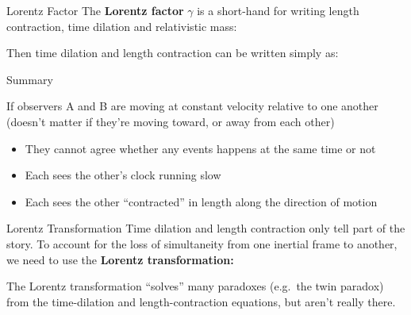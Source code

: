 \documentclass[12pt,compress,aspectratio=169]{beamer}
\newcommand{\bigsqrt}{\ensuremath\sqrt{1-\left(\frac{v}{c}\right)^2}}
\newcommand{\lorentz}{\ensuremath\frac{1}{\bigsqrt}}
\newcommand{\eq}[2]{\vspace{#1}{\Large\begin{displaymath}#2\end{displaymath}}}
\begin{document}
\begin{frame}{Lorentz Factor}
  The \textbf{Lorentz factor} $\gamma$ is a short-hand for writing length
  contraction, time dilation and relativistic mass:

  \eq{-.2in}{
    \boxed{\gamma=\lorentz}
  }
  
  Then time dilation and length contraction can be written simply as:
  
  \eq{-.1in}{
    \boxed{t' = \gamma t}\quad\boxed{L' = \frac{L}{\gamma}}
  }
\end{frame}


\begin{frame}{Summary}
  \begin{center}
  \end{center}
  If observers A and B are moving at constant velocity relative to one another
  (doesn't matter if they're moving toward, or away from each other)
  \begin{itemize}
  \item They cannot agree whether any events happens at the same time or not
  \item Each sees the other's clock running slow
  \item Each sees the other ``contracted'' in length along the direction of
    motion
  \end{itemize}
\end{frame}


\begin{frame}{Lorentz Transformation}
  Time dilation and length contraction only tell part of the story. To account
  for the loss of simultaneity from one inertial frame to another, we need to
  use the \textbf{Lorentz transformation:}

  
  \vspace{-.1in}The Lorentz transformation ``solves'' many paradoxes
  (e.g.\ the twin paradox) from the time-dilation and
  length-contraction equations, but aren't really there.
\end{frame}
\end{document}
